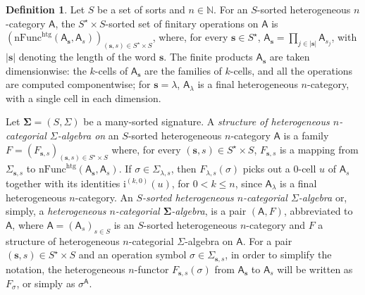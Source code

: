 \documentclass[a4paper, reqno]{amsbook}
\newcommand{\bb}[1]{\ensuremath{\lvert #1 \rvert}}
\newcommand{\sig}[1]{\mathbf{#1}}             %
\newcommand{\calg}[1]{\boldsymbol{\mathsf{#1}}} %
\newcommand{\htg}{\mathrm{htg}}                %
\theoremstyle{plain}
\theoremstyle{definition}
\newtheorem{definition}[theorem]{Definition}
\begin{document}
\begin{definition}\label{DCatAlgHtg}
Let $S$ be a set of sorts and $n\in\mathbb{N}$.
For an $S$-sorted heterogeneous $n$-category $\mathsf{A}$, the $S^{\star}\times S$-sorted set of finitary operations on $\mathsf{A}$ is $(\mathrm{nFunc}^{\htg}(\mathsf{A}_{\mathbf{s}},\mathsf{A}_{s}))_{(\mathbf{s},s)\in S^{\star}\times S}$, where, for every $\mathbf{s}\in S^{\star}$, $\mathsf{A}_{\mathbf{s}}=\prod_{j\in\bb{\mathbf{s}}}\mathsf{A}_{s_{j}}$, with $\bb{\mathbf{s}}$ denoting the length of the word $\mathbf{s}$.
The finite products $\mathsf{A}_{\mathbf{s}}$ are taken dimensionwise: the $k$-cells of $\mathsf{A}_{\mathbf{s}}$ are the families of $k$-cells, and all the operations are computed componentwise; for $\mathbf{s}=\lambda$, $\mathsf{A}_{\lambda}$ is a final heterogeneous $n$-category, with a single cell in each dimension.

Let $\sig{\Sigma}=(S,\Sigma)$ be a many-sorted signature.
A \emph{structure of heterogeneous $n$-categorial $\Sigma$-algebra on} an $S$-sorted heterogeneous $n$-category $\mathsf{A}$ is a family $F = (F_{\mathbf{s},s})_{(\mathbf{s},s)\in S^{\star}\times S}$ where, for every $(\mathbf{s},s)\in S^{\star}\times S$, $F_{\mathbf{s},s}$ is a mapping from $\Sigma_{\mathbf{s},s}$ to $\mathrm{nFunc}^{\htg}(\mathsf{A}_{\mathbf{s}},\mathsf{A}_{s})$.
If $\sigma\in \Sigma_{\lambda,s}$, then $F_{\lambda,s}(\sigma)$ picks out a $0$-cell $u$ of $\mathsf{A}_{s}$ together with its identities $\mathrm{i}^{(k,0)}(u)$, for $0<k\leq n$, since $\mathsf{A}_{\lambda}$ is a final heterogeneous $n$-category.
An \emph{$S$-sorted heterogeneous $n$-categorial $\Sigma$-algebra} or, simply, a \emph{heterogeneous $n$-categorial $\sig{\Sigma}$-algebra}, is a pair $(\mathsf{A},F)$, abbreviated to $\calg{A}$, where $\mathsf{A}=(\mathsf{A}_{s})_{s\in S}$ is an $S$-sorted heterogeneous $n$-category and $F$ a structure of heterogeneous $n$-categorial $\Sigma$-algebra on $\mathsf{A}$.
For a pair $(\mathbf{s},s)\in S^{\star}\times S$ and an operation symbol $\sigma\in \Sigma_{\mathbf{s},s}$, in order to simplify the notation, the heterogeneous $n$-functor $F_{\mathbf{s},s}(\sigma)$ from $\mathsf{A}_{\mathbf{s}}$ to $\mathsf{A}_{s}$ will be written as $F_{\sigma}$, or simply as $\sigma^{\calg{A}}$.


\end{definition}
\end{document}
